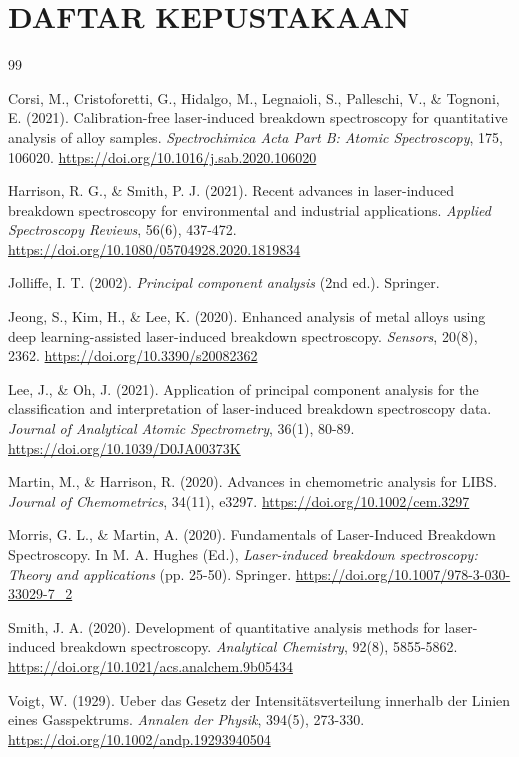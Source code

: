 \chapter*{DAFTAR KEPUSTAKAAN}

\begin{thebibliography}{99}


Corsi, M., Cristoforetti, G., Hidalgo, M., Legnaioli, S., Palleschi, V., \& Tognoni, E. (2021). Calibration-free laser-induced breakdown spectroscopy for quantitative analysis of alloy samples. \textit{Spectrochimica Acta Part B: Atomic Spectroscopy}, 175, 106020. \url{https://doi.org/10.1016/j.sab.2020.106020}

Harrison, R. G., \& Smith, P. J. (2021). Recent advances in laser-induced breakdown spectroscopy for environmental and industrial applications. \textit{Applied Spectroscopy Reviews}, 56(6), 437-472. \url{https://doi.org/10.1080/05704928.2020.1819834}

Jolliffe, I. T. (2002). \textit{Principal component analysis} (2nd ed.). Springer.

Jeong, S., Kim, H., \& Lee, K. (2020). Enhanced analysis of metal alloys using deep learning-assisted laser-induced breakdown spectroscopy. \textit{Sensors}, 20(8), 2362. \url{https://doi.org/10.3390/s20082362}

Lee, J., \& Oh, J. (2021). Application of principal component analysis for the classification and interpretation of laser-induced breakdown spectroscopy data. \textit{Journal of Analytical Atomic Spectrometry}, 36(1), 80-89. \url{https://doi.org/10.1039/D0JA00373K}

Martin, M., \& Harrison, R. (2020). Advances in chemometric analysis for LIBS. \textit{Journal of Chemometrics}, 34(11), e3297. \url{https://doi.org/10.1002/cem.3297}

Morris, G. L., \& Martin, A. (2020). Fundamentals of Laser-Induced Breakdown Spectroscopy. In M. A. Hughes (Ed.), \textit{Laser-induced breakdown spectroscopy: Theory and applications} (pp. 25-50). Springer. \url{https://doi.org/10.1007/978-3-030-33029-7_2}

Smith, J. A. (2020). Development of quantitative analysis methods for laser-induced breakdown spectroscopy. \textit{Analytical Chemistry}, 92(8), 5855-5862. \url{https://doi.org/10.1021/acs.analchem.9b05434}

Voigt, W. (1929). Ueber das Gesetz der Intensitätsverteilung innerhalb der Linien eines Gasspektrums. \textit{Annalen der Physik}, 394(5), 273-330. \url{https://doi.org/10.1002/andp.19293940504}

\end{thebibliography}